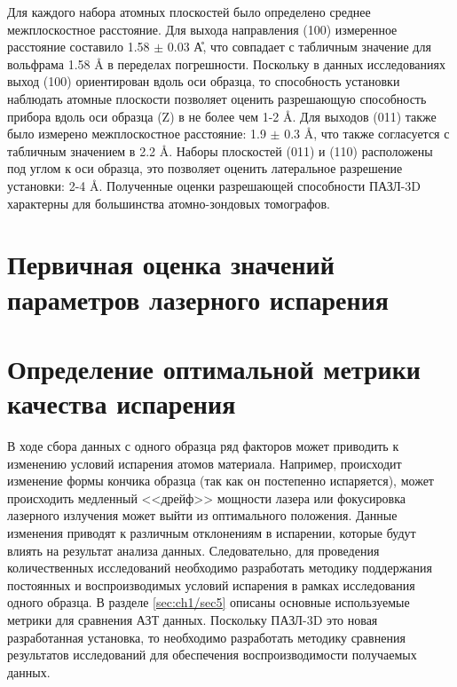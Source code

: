 Для каждого набора атомных плоскостей было определено среднее межплоскостное расстояние. Для выхода направления (100) измеренное расстояние составило 1.58 $\pm$ 0.03 \r{А}, что совпадает с табличным значение для вольфрама 1.58 \r{A} в переделах погрешности. Поскольку в данных исследованиях выход (100) ориентирован вдоль оси образца, то способность установки наблюдать атомные плоскости позволяет оценить разрешающую способность прибора вдоль оси образца (Z) в не более чем 1-2 \r{A}. Для выходов (011) также было измерено межплоскостное расстояние: 1.9 $\pm$ 0.3 \r{A}, что также согласуется с табличным значением в 2.2 \r{A}. Наборы плоскостей (011) и (110) расположены под углом к оси образца, это позволяет оценить латеральное разрешение установки: 2-4 \r{A}. Полученные оценки разрешающей способности ПАЗЛ-3D  характерны для большинства атомно-зондовых томографов. 

\FloatBarrier

\section{Первичная оценка значений параметров лазерного испарения}\label{sec:ch3/sect2}






\FloatBarrier

\section{Определение оптимальной метрики качества испарения}\label{sec:ch3/sect3}

В ходе сбора данных с одного образца ряд факторов может приводить к изменению условий испарения атомов материала. Например, происходит изменение формы кончика образца (так как он постепенно испаряется), может происходить медленный <<дрейф>>  мощности лазера или фокусировка лазерного излучения может выйти из оптимального положения. Данные изменения приводят к различным отклонениям в испарении, которые будут влиять на результат анализа данных. Следовательно, для проведения количественных исследований необходимо разработать методику поддержания постоянных и воспроизводимых условий испарения в рамках исследования одного образца. В разделе \cref{sec:ch1/sec5} описаны основные используемые метрики для сравнения АЗТ данных. Поскольку ПАЗЛ-3D это новая разработанная установка, то необходимо разработать методику сравнения результатов исследований для обеспечения воспроизводимости получаемых данных.

